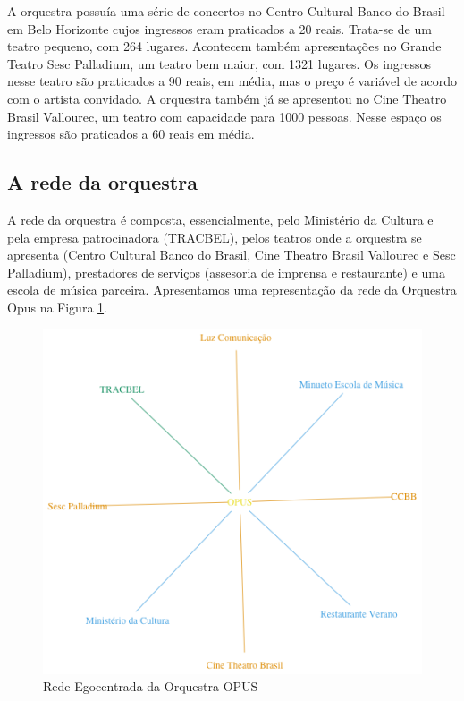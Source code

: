 \documentclass[a4paper, 12pt, openright, oneside, german, french, english, brazil]{abntex2}
\begin{document}
	A orquestra possuía uma série de concertos no Centro Cultural Banco do Brasil em Belo Horizonte cujos ingressos eram praticados a 20 reais. Trata-se de um teatro pequeno, com 264 lugares. Acontecem também apresentações no Grande Teatro Sesc Palladium, um teatro bem maior, com 1321 lugares. Os ingressos nesse teatro são praticados a 90 reais, em média, mas o preço é variável de acordo com o artista convidado. A orquestra também já se apresentou no Cine Theatro Brasil Vallourec, um teatro com capacidade para 1000 pessoas. Nesse espaço os ingressos são praticados a 60 reais em média.
	
	\subsection{A rede da orquestra}
	
	A rede da orquestra é composta, essencialmente, pelo Ministério da Cultura e pela empresa patrocinadora (TRACBEL), pelos teatros onde a orquestra se apresenta (Centro Cultural Banco do Brasil, Cine Theatro Brasil Vallourec e Sesc Palladium), prestadores de serviços (assesoria de imprensa e restaurante) e uma escola de música parceira. Apresentamos uma representação da rede da Orquestra Opus na Figura \ref{rede-opus}.
	
	\begin{figure}[!h]
		\centering
		\caption{Rede Egocentrada da Orquestra OPUS}
		\label{rede-opus}
		\includegraphics[scale=.7]{rede_opus.png}
	\end{figure}
	
\end{document}
